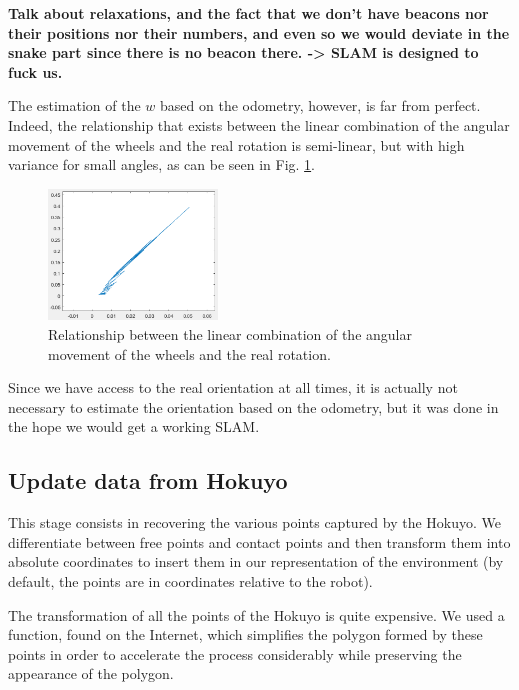 \documentclass[a4paper, 10pt, conference]{ieeeconf}
\begin{document}
    \textbf{Talk about relaxations, and the fact that we don't have beacons nor their positions nor their numbers, and even so we would deviate in the snake part since there is no beacon there. -> SLAM is designed to fuck us.}
    
    The estimation of the $w$ based on the odometry, however, is far from perfect. Indeed, the relationship that exists between the linear combination of the angular movement of the wheels and the real rotation is semi-linear, but with high variance for small angles, as can be seen in Fig. \ref{fig:slam.relationship.rotation}.
    
    \begin{figure}[!h]
        \centering
        \includegraphics[width=0.4\textwidth]{resources/png/relationship-rotation.png}
        \caption{Relationship between the linear combination of the angular movement of the wheels and the real rotation.}
        \label{fig:slam.relationship.rotation}
    \end{figure}
    
    Since we have access to the real orientation at all times, it is actually not necessary to estimate the orientation based on the odometry, but it was done in the hope we would get a working SLAM.
    
    \subsection{Update data from Hokuyo}
    
    This stage consists in recovering the various points captured by the Hokuyo. We differentiate between free points and contact points and then transform them into absolute coordinates to insert them in our representation of the environment (by default, the points are in coordinates relative to the robot).
    
    The transformation of all the points of the Hokuyo is quite expensive. We used a function, found on the Internet, which simplifies the polygon formed by these points in order to accelerate the process considerably while preserving the appearance of the polygon.
    
\end{document}
